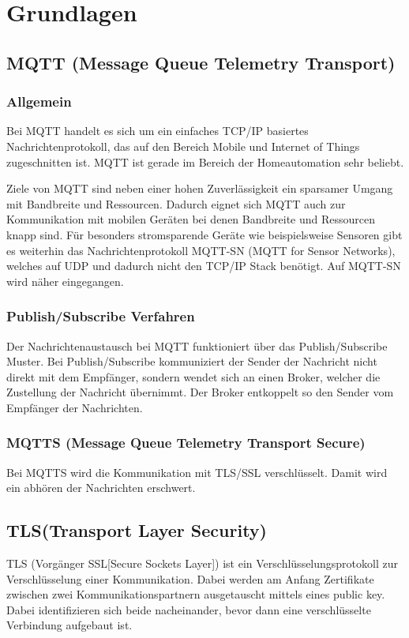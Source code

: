 \chapter{Grundlagen}
\label{cha:Grundlagen}

\section{MQTT (Message Queue Telemetry Transport)}

\subsection{Allgemein}
Bei MQTT handelt es sich um ein einfaches TCP/IP basiertes Nachrichtenprotokoll, das auf den Bereich Mobile und Internet of Things zugeschnitten ist. MQTT ist gerade im Bereich der Homeautomation sehr beliebt.

Ziele von MQTT sind neben einer hohen Zuverlässigkeit ein sparsamer Umgang mit Bandbreite und Ressourcen. Dadurch eignet sich MQTT auch zur Kommunikation mit mobilen Geräten bei denen Bandbreite und Ressourcen knapp sind. Für besonders stromsparende Geräte wie beispielsweise Sensoren gibt es weiterhin das Nachrichtenprotokoll MQTT-SN (MQTT for Sensor Networks), welches auf UDP und dadurch nicht den TCP/IP Stack benötigt. Auf MQTT-SN wird näher eingegangen.

\subsection{Publish/Subscribe Verfahren}
Der Nachrichtenaustausch bei MQTT funktioniert über das Publish/Subscribe Muster. Bei Publish/Subscribe kommuniziert der Sender der Nachricht nicht direkt mit dem Empfänger, sondern wendet sich an einen Broker, welcher die Zustellung der Nachricht übernimmt. Der Broker entkoppelt so den Sender vom Empfänger der Nachrichten.

\subsection{MQTTS (Message Queue Telemetry Transport Secure)}
Bei MQTTS wird die Kommunikation mit TLS/SSL verschlüsselt. Damit wird ein abhören der Nachrichten erschwert.

\section{TLS(Transport Layer Security)}
TLS (Vorgänger SSL[Secure Sockets Layer]) ist ein Verschlüsselungsprotokoll zur Verschlüsselung einer Kommunikation. Dabei werden am Anfang Zertifikate zwischen zwei Kommunikationspartnern ausgetauscht mittels eines public key. Dabei identifizieren sich beide nacheinander, bevor dann eine verschlüsselte Verbindung aufgebaut ist.

